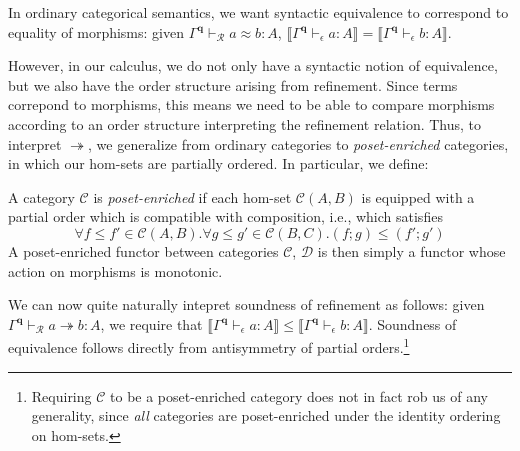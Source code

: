 \documentclass[acmsmall,screen,review]{acmart}
\newcommand{\mc}[1]{\ensuremath{\mathcal{#1}}}
\newcommand{\mb}[1]{\ensuremath{\mathbf{#1}}}
\newcommand{\hasty}[4]{#1 \vdash_{#2} #3: {#4}}
\newcommand{\teqv}{\approx}
\newcommand{\tref}{\twoheadrightarrow}
\newcommand{\tmle}[5]{#1 \vdash_{#2} #3 \tref #4 : {#5}}
\newcommand{\tmeq}[5]{#1 \vdash_{#2} #3 \teqv #4 : {#5}}
\newcommand{\dnt}[1]{\llbracket{#1}\rrbracket}
\begin{document}
In ordinary categorical semantics, we want syntactic equivalence to
correspond to equality of morphisms: given $\tmeq{\Gamma^{\mb{q}}}{\mc{R}}{a}{b}{A}$,
$\dnt{\hasty{\Gamma^{\mb{q}}}{\epsilon}{a}{A}} = \dnt{\hasty{\Gamma^{\mb{q}}}{\epsilon}{b}{A}}$. 

However, in our calculus, we do not only have a syntactic notion of equivalence, but we also have the order structure arising from refinement. Since terms correpond to morphisms, this means we need to be able to compare morphisms according to an order structure interpreting the refinement relation. Thus, to interpret $\tref$, we generalize from ordinary categories to 
\emph{poset-enriched} categories, in which our hom-sets are partially ordered. In particular, we define:

\begin{definition}
  A category $\mc{C}$ is \emph{poset-enriched} if each hom-set $\mc{C}(A, B)$ is equipped with a
  partial order which is compatible with composition, i.e., which satisfies
  $$
  \forall f \leq f' \in \mc{C}(A, B) . \forall g \leq g' \in \mc{C}(B, C) . (f ; g) \leq (f' ; g')
  $$
  A poset-enriched functor between categories $\mc{C}$, $\mc{D}$ is then simply a functor whose
  action on morphisms is monotonic.
\end{definition}

We can now quite
naturally intepret soundness of refinement as follows: given
$\tmle{\Gamma^{\mb{q}}}{\mc{R}}{a}{b}{A}$, we require that
$\dnt{\hasty{\Gamma^{\mb{q}}}{\epsilon}{a}{A}} \leq \dnt{\hasty{\Gamma^{\mb{q}}}{\epsilon}{b}{A}}$.
Soundness of equivalence follows directly from antisymmetry of partial orders.\footnote{Requiring $\mc{C}$ to be a poset-enriched category does not in fact rob us of any generality, since
\emph{all} categories are poset-enriched under the identity ordering on hom-sets.}
\end{document}

